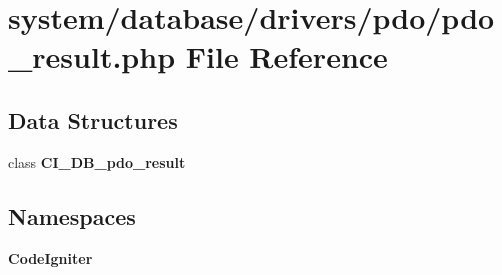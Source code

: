 \section{system/database/drivers/pdo/pdo\-\_\-result.php File Reference}
\label{pdo__result_8php}
\subsection*{Data Structures}
\begin{DoxyCompactItemize}
\item 
class {\bf C\-I\-\_\-\-D\-B\-\_\-pdo\-\_\-result}
\end{DoxyCompactItemize}
\subsection*{Namespaces}
\begin{DoxyCompactItemize}
\item 
{\bf Code\-Igniter}
\end{DoxyCompactItemize}
